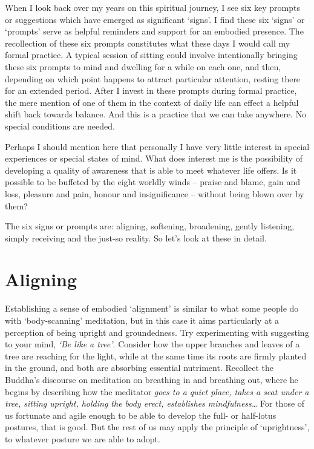When I look back over my years on this spiritual journey, I see six key
prompts or suggestions which have emerged as significant ‘signs’. I find
these six ‘signs’ or ‘prompts’ serve as helpful reminders and support
for an embodied presence. The recollection of these six prompts
constitutes what these days I would call my formal practice. A typical
session of sitting could involve intentionally bringing these six
prompts to mind and dwelling for a while on each one, and then,
depending on which point happens to attract particular attention,
resting there for an extended period. After I invest in these prompts
during formal practice, the mere mention of one of them in the context
of daily life can effect a helpful shift back towards balance. And this
is a practice that we can take anywhere. No special conditions are
needed.

Perhaps I should mention here that personally I have very little
interest in special experiences or special states of mind. What does
interest me is the possibility of developing a quality of awareness that
is able to meet whatever life offers. Is it possible to be buffeted by
the eight worldly winds\cite{worldly-dhammas}
 – praise and blame, gain and loss, pleasure
and pain, honour and insignificance – without being blown over by them?

The six signs or prompts are: aligning, softening, broadening, gently
listening, simply receiving and the just-so reality. So let’s look at
these in detail.

\section{Aligning}

Establishing a sense of embodied ‘alignment’ is similar to what some
people do with ‘body-scanning’ meditation, but in this case it aims
particularly at a perception of being upright and groundedness. Try
experimenting with suggesting to your mind, \emph{‘Be like a tree’}. Consider
how the upper branches and leaves of a tree are reaching for the
light, while at the same time its roots are firmly planted in the
ground, and both are absorbing essential nutriment. Recollect the
Buddha’s discourse on meditation on breathing in and breathing
out\cite{anapanasati},
where he begins by describing how the meditator \emph{goes to a quiet place,
takes a seat under a tree, sitting upright, holding the body erect,
establishes mindfulness…​} For those of us fortunate and agile enough
to be able to develop the full- or half-lotus postures, that is good.
But the rest of us may apply the principle of ‘uprightness’, to whatever
posture we are able to adopt.

